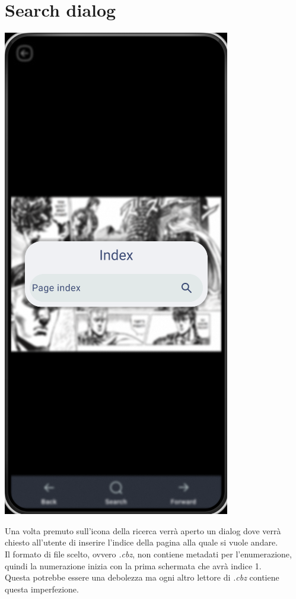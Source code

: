 \documentclass{report}
\begin{document}
\section{Search dialog}

\begin{center}
   \includegraphics[scale=0.4]{search_dialog.png}
\end{center}

Una volta premuto sull'icona della ricerca verrà aperto un dialog dove verrà chiesto all'utente di inserire l'indice della pagina alla quale si vuole andare.\\
Il formato di file scelto, ovvero \emph{.cbz}, non contiene metadati per l'enumerazione, quindi la numerazione inizia con la prima schermata che avrà indice 1.\\
Questa potrebbe essere una debolezza ma ogni altro lettore di \emph{.cbz} contiene questa imperfezione.
\end{document}
